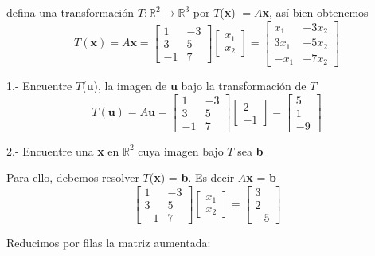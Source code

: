 \documentclass[12 pt]{article}
\begin{document}
defina una transformación $T: \mathbb{R}^2 \rightarrow \mathbb{R}^3$ por $T$(\textbf{x}) $= A$\textbf{x}, así bien obtenemos $$T(\mathbf{x}) = A\mathbf{x} = \left[\begin{array}{rr}
    1 & -3 \\ 3 & 5 \\ -1 & 7
\end{array}\right] \begin{bmatrix} x_1 \\ x_2 \end{bmatrix} = \left[\begin{array}{rr}
    x_1 & -3x_2 \\ 3x_1 & +5x_2 \\ -x_1 & +7x_2
\end{array}\right]$$

1.- Encuentre $T$(\textbf{u}), la imagen de \textbf{u} bajo la transformación de $T$ $$T(\mathbf{u}) = A\mathbf{u} = \left[\begin{array}{rr}
    1 & -3 \\ 3 & 5 \\ -1 & 7
\end{array}\right] \begin{bmatrix}
2 \\ -1
\end{bmatrix} = \left[\begin{array}{r}
    5 \\ 1 \\ -9
\end{array}\right]$$

2.- Encuentre una \textbf{x} en $\mathbb{R}^2$ cuya imagen bajo $T$ sea \textbf{b}

Para ello, debemos resolver $T$(\textbf{x}) = \textbf{b}. Es decir $A$\textbf{x} = \textbf{b} $$\left[\begin{array}{rr}
        1 & -3 \\ 3 & 5 \\ -1 & 7
\end{array}\right] \begin{bmatrix}
    x_1 \\ x_2
\end{bmatrix} = \left[\begin{array}{r}
        3 \\ 2 \\ -5
\end{array}\right]$$

Reducimos por filas la matriz aumentada:
\end{document}
